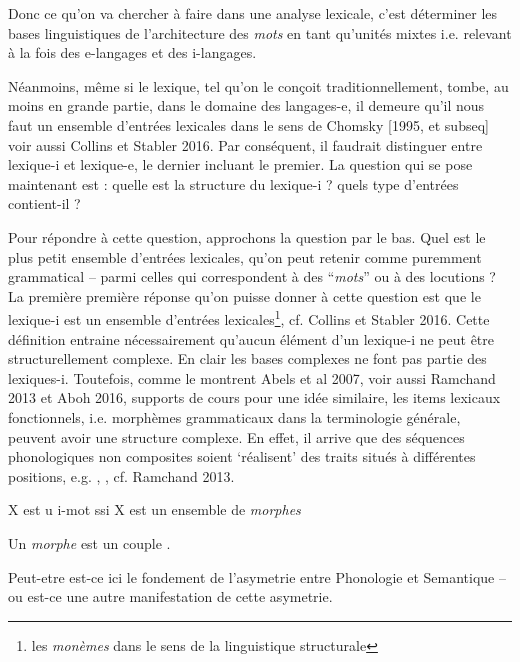       Donc ce qu'on va chercher \`a faire dans une analyse lexicale, c'est d\'eterminer les bases linguistiques de l'architecture des \textit{mots} en tant qu'unit\'es mixtes i.e. relevant \`a la fois des e-langages et des i-langages. 
      
	  
	  N\'eanmoins, m\^eme si le lexique, tel qu'on le con\c coit traditionnellement, tombe, au moins en grande partie, dans le domaine des langages-e, il demeure qu'il nous faut un ensemble d'entr\'ees lexicales dans le sens de Chomsky [1995, et subseq] voir aussi Collins et Stabler 2016. Par cons\'equent, il faudrait distinguer entre lexique-i et lexique-e, le dernier incluant le premier. La question qui se pose maintenant est : quelle est la structure du lexique-i ? quels type d'entr\'ees contient-il ? 
	  
	  Pour r\'epondre \`a cette question, approchons la question par le bas. Quel est le plus petit ensemble d'entr\'ees lexicales, qu'on peut retenir comme puremment grammatical -- parmi celles qui correspondent \`a des ``\textit{mots}'' ou \`a des locutions ?  
	  La premi\`ere premi\`ere r\'eponse qu'on puisse donner \`a cette question est que le lexique-i est un ensemble d'entr\'ees lexicales\footnote{les \textit{mon\`emes} dans le sens de la linguistique structurale}, cf. Collins et Stabler 2016. Cette d\'efinition entraine n\'ecessairement qu'aucun \'el\'ement d'un lexique-i ne peut \^etre structurellement complexe. En clair les bases complexes ne font pas partie des lexiques-i. Toutefois, comme le montrent Abels et al 2007, voir aussi Ramchand 2013 et Aboh 2016, supports de cours pour une id\'ee similaire, les items lexicaux fonctionnels, i.e. morph\`emes grammaticaux dans la terminologie g\'en\'erale, peuvent avoir une structure complexe. En effet, il arrive que des s\'equences phonologiques non composites soient `r\'ealisent' des traits situ\'es \`a diff\'erentes positions, e.g. , , cf. Ramchand 2013.
	  
      \begin{defin}
      	X est u i-mot ssi X est un ensemble de \textit{morphes}
      \end{defin}
      \begin{defin}
      	Un \textit{morphe} est un couple .
      \end{defin}
      Peut-etre est-ce ici le fondement de l'asymetrie entre Phonologie et Semantique -- ou est-ce une autre manifestation de cette asymetrie. 
